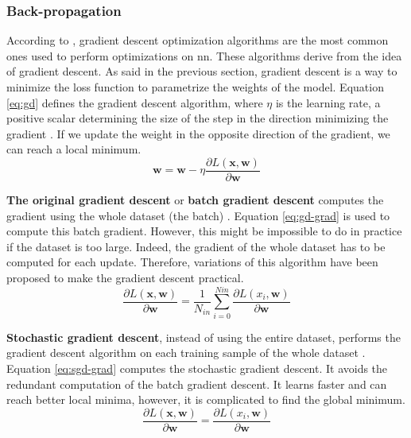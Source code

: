 \subsubsection{Back-propagation} \label{subs:trainbackward}
According to \textcite{ruder_overview_2017}, gradient descent optimization algorithms are the most common ones used to perform optimizations on \acrshort{nn}. These algorithms derive from the idea of gradient descent. As said in the previous section, gradient descent is a way to minimize the loss function to parametrize the weights of the model. Equation \eqref{eq:gd} defines the gradient descent algorithm, where $\eta$ is the learning rate, a positive scalar determining the size of the step in the direction minimizing the gradient \cite{goodfellow_deep_2016, ruder_overview_2017}. If we update the weight in the opposite direction of the gradient, we can reach a local minimum.
%
\begin{equation}
    \boldsymbol{w} = \boldsymbol{w} - \eta \frac{ \partial L( \boldsymbol{x}, \boldsymbol{w} ) }{\partial \boldsymbol{w}}
    \label{eq:gd}
\end{equation}

\textbf{The original gradient descent} or \textbf{batch gradient descent} computes the gradient using the whole dataset (the batch) \cite{matteucci_artificial_2019, ruder_overview_2017,}. Equation \eqref{eq:gd-grad} is used to compute this batch gradient. However, this might be impossible to do in practice if the dataset is too large. Indeed, the gradient of the whole dataset has to be computed for each update. Therefore, variations of this algorithm have been proposed to make the gradient descent practical.
%
\begin{equation}
    \frac{ \partial L( \boldsymbol{x}, \boldsymbol{w} ) }{\partial \boldsymbol{w}} = \frac{1}{N_{in}} \sum^{Nin}_{i = 0} \frac{ \partial L( x_i, \boldsymbol{w} ) }{\partial \boldsymbol{w}}
    \label{eq:gd-grad}
\end{equation}

\textbf{Stochastic gradient descent}, instead of using the entire dataset, performs the gradient descent algorithm on each training sample of the whole dataset \cite{ruder_overview_2017, matteucci_artificial_2019}. Equation \eqref{eq:sgd-grad} computes the stochastic gradient descent. It avoids the redundant computation of the batch gradient descent. It learns faster and can reach better local minima, however, it is complicated to find the global minimum.
%
\begin{equation}
    \frac{ \partial L( \boldsymbol{x}, \boldsymbol{w} ) }{\partial \boldsymbol{w}} = \frac{ \partial L( x_i, \boldsymbol{w} ) }{\partial \boldsymbol{w}}
    \label{eq:sgd-grad}
\end{equation}

